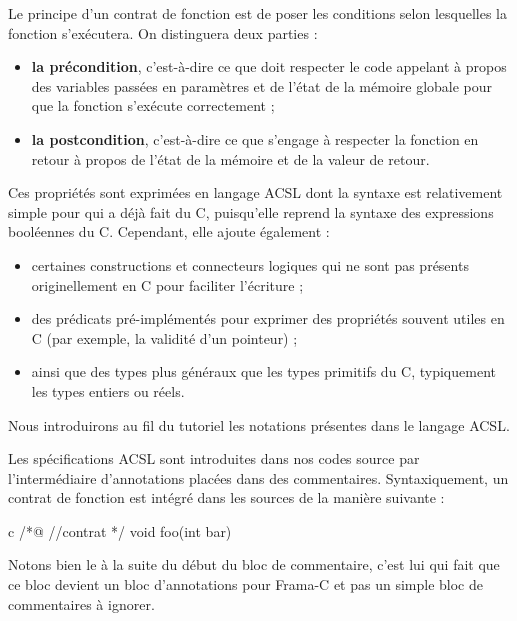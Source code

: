 Le principe d'un contrat de fonction est de poser les conditions selon
lesquelles la fonction s'exécutera. On distinguera deux parties :


\begin{itemize}
\item \textbf{la précondition}, c'est-à-dire ce que doit respecter le code
      appelant à propos des variables passées en paramètres et de l'état de
      la mémoire globale pour que la fonction s'exécute correctement ;
\item \textbf{la postcondition}, c'est-à-dire ce que s'engage à respecter la
      fonction en retour à propos de l'état de la mémoire et de la valeur de
      retour.
\end{itemize}


Ces propriétés sont exprimées en langage ACSL dont la syntaxe est relativement 
simple pour qui a déjà fait du C, puisqu'elle reprend la syntaxe des expressions
booléennes du C. Cependant, elle ajoute également :



\begin{itemize}
\item certaines constructions et connecteurs logiques qui ne sont pas présents 
originellement en C pour faciliter l'écriture ;
\item des prédicats pré-implémentés pour exprimer des propriétés souvent utiles 
en C (par exemple, la validité d'un pointeur) ;
\item ainsi que des types plus généraux que les types primitifs du C, 
typiquement les types entiers ou réels.
\end{itemize}


Nous introduirons au fil du tutoriel les notations présentes dans le 
langage ACSL.



Les spécifications ACSL sont introduites dans nos codes source par
l'intermédiaire d'annotations placées dans des commentaires. Syntaxiquement,
un contrat de fonction est intégré dans les sources de la manière suivante :



\begin{CodeBlock}{c}
/*@
  //contrat
*/
void foo(int bar){

}
\end{CodeBlock}



Notons bien le  à la suite du début du bloc de commentaire, c'est lui qui 
fait que ce bloc devient un bloc d'annotations pour Frama-C et pas un simple 
bloc de commentaires à ignorer.



